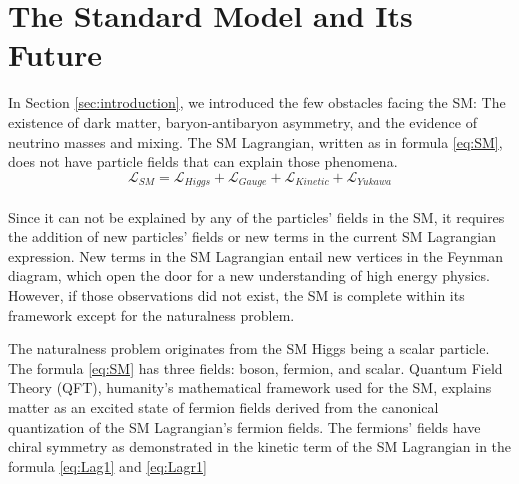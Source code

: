 \chapter{The Standard Model and Its Future}\label{sec:theory}
In Section \ref{sec:introduction}, we introduced the few obstacles facing the SM: The existence of dark matter, baryon-antibaryon asymmetry, and the evidence of neutrino masses and mixing.
The SM Lagrangian, written as in formula \ref{eq:SM}, does not have particle fields that can explain those phenomena.
\begin{equation}
\label{eq:SM}
\mathcal{L}_{SM} = \mathcal{L}_{Higgs}+\mathcal{L}_{Gauge}+\mathcal{L}_{Kinetic}+\mathcal{L}_{Yukawa}
\end{equation}
\begin{align*}
\end{align*}

Since it can not be explained by any of the particles' fields in the SM, it requires the addition of new particles' fields or new terms in the current SM Lagrangian expression.
New terms in the SM Lagrangian entail new vertices in the Feynman diagram, which open the door for a new understanding of high energy physics.
However, if those observations did not exist, the SM is complete within its framework except for the naturalness problem.

The naturalness problem originates from the SM Higgs being a scalar particle.
The formula \ref{eq:SM} has three fields: boson, fermion, and scalar.
Quantum Field Theory (QFT), humanity's mathematical framework used for the SM, explains matter as an excited state of fermion fields derived from the canonical quantization of the SM Lagrangian's fermion fields.
The fermions' fields have chiral symmetry as demonstrated in the kinetic term of the SM Lagrangian in the formula \ref{eq:Lag1} and \ref{eq:Lagr1}


